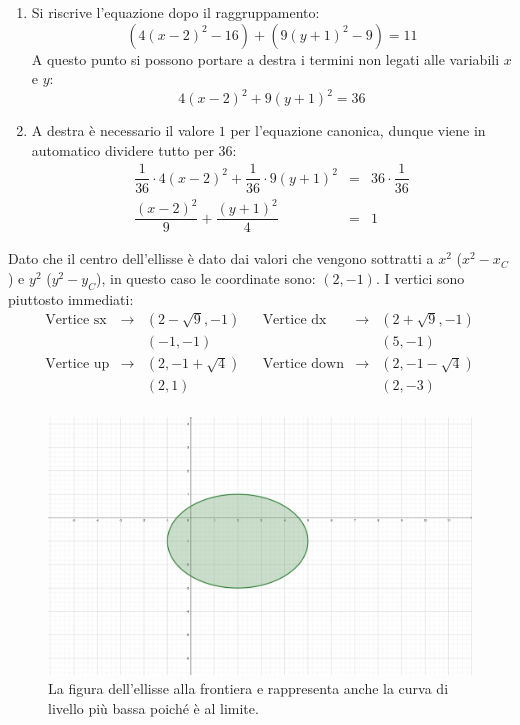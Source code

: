 \documentclass[a4paper]{article}
\begin{document}
\begin{enumerate}[label=\alph*.]
		\item Si riscrive l'equazione dopo il raggruppamento:
		\begin{equation*}
			\left(4\left(x-2\right)^{2} - 16\right) + \left(9\left(y+1\right)^{2} - 9\right) = 11
		\end{equation*}
		A questo punto si possono portare a destra i termini non legati alle variabili $x$ e $y$:
		\begin{equation*}
			4\left(x-2\right)^{2} + 9\left(y+1\right)^{2} = 36
		\end{equation*}

		\item A destra è necessario il valore $1$ per l'equazione canonica, dunque viene in automatico dividere tutto per $36$:
		\begin{equation*}
			\begin{array}{rcl}
				\dfrac{1}{36} \cdot 4\left(x-2\right)^{2} + \dfrac{1}{36} \cdot 9\left(y+1\right)^{2} &=& 36 \cdot \dfrac{1}{36} \\ [1em]
				\dfrac{\left(x-2\right)^{2}}{9} + \dfrac{\left(y+1\right)^{2}}{4} &=& 1
			\end{array}
		\end{equation*}
	\end{enumerate}
	Dato che il centro dell'ellisse è dato dai valori che vengono sottratti a $x^{2}$ ($x^{2}-x_{C}$) e $y^{2}$ ($y^{2}-y_{C}$), in questo caso le coordinate sono: $\left(2, -1\right)$. I vertici sono piuttosto immediati:
	\begin{equation*}
		\begin{array}{lclclcl}
			\text{Vertice sx} &\rightarrow& \left(2-\sqrt{9}, -1\right) && \text{Vertice dx} &\rightarrow& \left(2+\sqrt{9}, -1\right) \\ [.3em]
										 && \left(-1, -1\right) && && \left(5, -1\right) \\ [.3em]
			\text{Vertice up} &\rightarrow& \left(2, -1 + \sqrt{4}\right) && \text{Vertice down} &\rightarrow& \left(2, -1-\sqrt{4}\right) \\ [.3em]
			&& \left(2, 1\right) && && \left(2, -3\right) \\
		\end{array}
	\end{equation*}\newpage

	\begin{figure}[!htp]
		\centering
		\includegraphics[width=.8\textwidth]{img/curve_di_livello-2.pdf}
		\caption*{La figura dell'ellisse alla frontiera e rappresenta anche la curva di livello più bassa poiché è al limite.}
	\end{figure}
\end{document}
